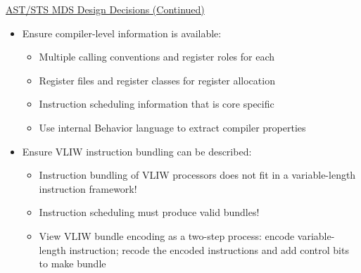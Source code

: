 \documentclass[a4]{seminar}
\begin{document}
\begin{slide}

\begin{center} \underline{AST/STS MDS Design Decisions (Continued)} \end{center}

\begin{itemize}

\item Ensure compiler-level information is available:
  \begin{itemize}
    \item Multiple calling conventions and register roles for each
    \item Register files and register classes for register allocation
    \item Instruction scheduling information that is core specific
    \item Use internal Behavior language to extract compiler properties
  \end{itemize}

\item Ensure VLIW instruction bundling can be described:
  \begin{itemize}
    \item Instruction bundling of VLIW processors does not fit in a
    variable-length instruction framework!
    \item Instruction scheduling must produce valid bundles!
    \item View VLIW bundle encoding as a two-step process: encode
    variable-length instruction; recode the encoded instructions and add control
    bits to make bundle
  \end{itemize}

\end{itemize}

\end{slide}
\end{document}
